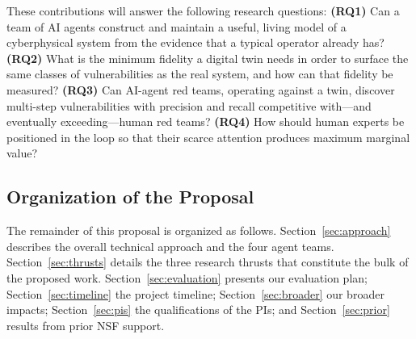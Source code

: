 These contributions will answer the following research questions:
\textbf{(RQ1)} Can a team of AI agents construct and maintain a useful,
living model of a cyberphysical system from the evidence that a typical
operator already has?
\textbf{(RQ2)} What is the minimum fidelity a digital twin needs in
order to surface the same classes of vulnerabilities as the real
system, and how can that fidelity be measured?
\textbf{(RQ3)} Can AI-agent red teams, operating against a twin,
discover multi-step vulnerabilities with precision and recall
competitive with---and eventually exceeding---human red teams?
\textbf{(RQ4)} How should human experts be positioned in the loop so
that their scarce attention produces maximum marginal value?

\subsection{Organization of the Proposal}
The remainder of this proposal is organized as follows.
Section~\ref{sec:approach} describes the overall technical approach and
the four agent teams.
Section~\ref{sec:thrusts} details the three research thrusts that
constitute the bulk of the proposed work.
Section~\ref{sec:evaluation} presents our evaluation plan;
Section~\ref{sec:timeline} the project timeline;
Section~\ref{sec:broader} our broader impacts;
Section~\ref{sec:pis} the qualifications of the PIs;
and Section~\ref{sec:prior} results from prior NSF support.
